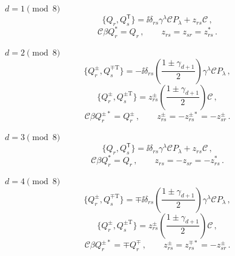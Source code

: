 \medskip
\noindent \(d=1\pmod 8\)
\begin{equation}
  \{Q_r,Q_s^{\mathsf T}\}
  =\ii\delta_{rs}\gamma^\lambda\mathcal C P_\lambda+z_{rs}\mathcal C\,,
  \tag{32.1.32}\label{eq:32.1.32}
\end{equation}
\begin{equation}
  \mathcal C\beta Q_r^*=Q_r\,,
  \qquad z_{rs}=z_{sr}=z_{rs}^*\,.
  \tag{32.1.33}\label{eq:32.1.33}
\end{equation}

\medskip
\noindent \(d=2\pmod 8\)
\begin{equation}
  \{Q_r^\pm,Q_s^{\mp\mathrm T}\}
  =-\ii\delta_{rs}
  \left(\frac{1\pm\gamma_{d+1}}{2}\right)
  \gamma^\lambda\mathcal C P_\lambda\,,
  \tag{32.1.34}\label{eq:32.1.34}
\end{equation}
\begin{equation}
  \{Q_r^\pm,Q_s^{\pm\mathrm T}\}
  =z_{rs}^{\pm}
  \left(\frac{1\pm\gamma_{d+1}}{2}\right)\mathcal C\,,
  \tag{32.1.35}\label{eq:32.1.35}
\end{equation}
\begin{equation}
  \mathcal C\beta Q_r^{\pm*}=Q_r^\pm\,,
  \qquad
  z_{rs}^{\pm}=-z_{rs}^{\pm*}=-z_{sr}^{\pm}\,.
  \tag{32.1.36}\label{eq:32.1.36}
\end{equation}

\medskip
\noindent \(d=3\pmod 8\)
\begin{equation}
  \{Q_r,Q_s^{\mathsf T}\}
  =\ii\delta_{rs}\gamma^\lambda\mathcal C P_\lambda+z_{rs}\mathcal C\,,
  \tag{32.1.37}\label{eq:32.1.37}
\end{equation}
\begin{equation}
  \mathcal C\beta Q_r^*=Q_r\,,
  \qquad z_{rs}=-z_{sr}=-z_{rs}^*\,.
  \tag{32.1.38}\label{eq:32.1.38}
\end{equation}

\medskip
\noindent \(d=4\pmod 8\)
\begin{equation}
  \{Q_r^\pm,Q_s^{\mp\mathrm T}\}
  =\mp \ii\delta_{rs}
  \left(\frac{1\pm\gamma_{d+1}}{2}\right)
  \gamma^\lambda\mathcal C P_\lambda\,,
  \tag{32.1.39}\label{eq:32.1.39}
\end{equation}
\begin{equation}
  \{Q_r^\pm,Q_s^{\pm\mathrm T}\}
  =z_{rs}^{\pm}
  \left(\frac{1\pm\gamma_{d+1}}{2}\right)\mathcal C\,,
  \tag{32.1.40}\label{eq:32.1.40}
\end{equation}
\begin{equation}
  \mathcal C\beta Q_r^{\pm*}=\mp Q_r^\mp\,,
  \qquad
  z_{rs}^{\pm}=z_{rs}^{\mp*}=-z_{sr}^{\pm}\,.
  \tag{32.1.41}\label{eq:32.1.41}
\end{equation}

